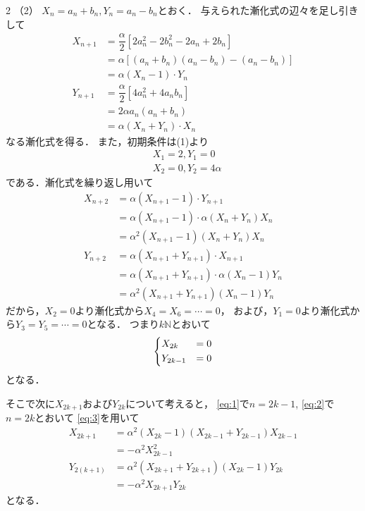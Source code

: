 \documentclass[../../main.tex]{subfiles}
\begin{document}
\begin{multicols}{2}
  （2）
  $X_n = a_n + b_n, Y_n = a_n - b_n$とおく．
  与えられた漸化式の辺々を足し引きして
  \begin{align}
    X_{n+1}
    & = \dfrac{\alpha}{2} \left[2a_n^2-2b_n^2-2a_n+2b_n\right] \\
    & = \alpha \left[(a_n+b_n)(a_n-b_n)-(a_n-b_n)\right]      \\
    & = \alpha (X_n - 1) \cdot Y_n                            \\
    Y_{n+1}
    & = \dfrac{\alpha}{2} \left[4a_n^2+4a_nb_n\right]          \\
    & = 2\alpha a_n(a_n+b_n)                                  \\
    & = \alpha (X_n+Y_n) \cdot X_n
  \end{align}
  なる漸化式を得る．
  また，初期条件は(1)より
  \begin{align}
    & X_1  = 2, Y_1 = 0      \\
    & X_2 = 0, Y_2 = 4\alpha
  \end{align}
  である．漸化式を繰り返し用いて
  \begin{align}
    X_{n+2}
    & =  \alpha (X_{n+1} - 1) \cdot Y_{n+1}                       \\
    & = \alpha (X_{n+1} - 1) \cdot  \alpha (X_n+Y_n)X_n           \\
    & = \alpha^2 (X_{n+1} - 1)(X_n+Y_n)X_n   \label{eq:1}  \\
    Y_{n+2}
    & = \alpha (X_{n+1}+Y_{n+1}) \cdot X_{n+1}                    \\
    & = \alpha (X_{n+1}+Y_{n+1}) \cdot \alpha (X_n - 1)Y_n        \\
    & = \alpha^2 (X_{n+1}+Y_{n+1})(X_n - 1)Y_n\label{eq:2}
  \end{align}
  だから，$X_2=0$より漸化式から$X_4=X_6=\cdots = 0$，
  および，$Y_1=0$より漸化式から$Y_3=Y_5=\cdots = 0$となる．
  つまり$k\mathbb{N}$とおいて
  \begin{align}
    \begin{dcases}
      X_{2k}   & = 0 \\
      Y_{2k-1} & = 0
    \end{dcases}\label{eq:3}
  \end{align}
  となる．

  そこで次に$X_{2k+1}$および$Y_{2k}$について考えると，
  \cref{eq:1}で$n=2k-1$, \cref{eq:2}で$n=2k$とおいて
  \cref{eq:3}を用いて
  \begin{align}
    X_{2k+1}
    & = \alpha^2 (X_{2k} - 1)(X_{2k-1}+Y_{2k-1})X_{2k-1} \\
    & = -\alpha^2 X^2_{2k-1} \label{eq:4}         \\
    Y_{2(k+1)}
    & =\alpha^2 (X_{2k+1}+Y_{2k+1})(X_{2k} - 1)Y_{2k}    \\
    & = - \alpha^2 X_{2k+1}Y_{2k} \label{eq:5}
  \end{align}
  となる．


\end{multicols}
\end{document}

